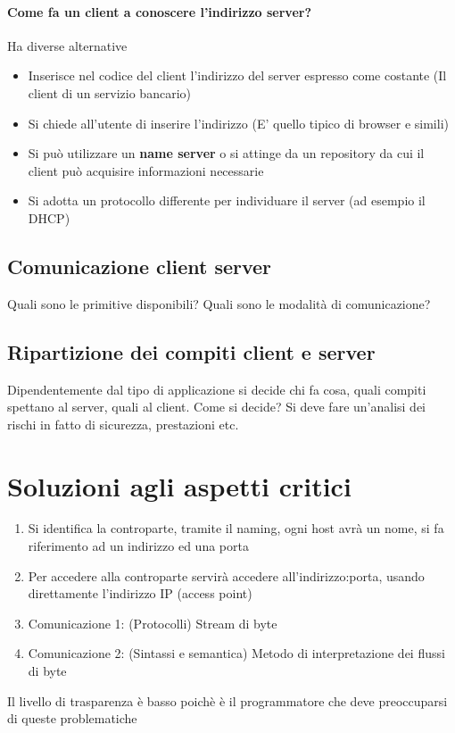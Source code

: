 \documentclass[12pt, a4paper, openany, twoside]{book}
\begin{document}
\paragraph{Come fa un client a conoscere l'indirizzo server?} Ha diverse alternative
\begin{itemize}
	\item Inserisce nel codice del client l'indirizzo del server espresso
	come costante (Il client di un servizio bancario)
	\item Si chiede all'utente di inserire l'indirizzo (E' quello tipico di 
	browser e simili)
	\item Si può utilizzare un \textbf{name server} o si attinge da un repository
	da cui il client può acquisire informazioni necessarie
	\item Si adotta un protocollo differente per individuare il server (ad 
	esempio il DHCP)
\end{itemize}
\subsection{Comunicazione client server}
Quali sono le primitive disponibili? Quali sono le modalità di comunicazione?
\subsection{Ripartizione dei compiti client e server}
Dipendentemente dal tipo di applicazione si decide chi fa cosa, quali compiti
spettano al server, quali al client. Come si decide? Si deve fare un'analisi
dei rischi in fatto di sicurezza, prestazioni etc.
\section{Soluzioni agli aspetti critici}
\begin{enumerate}
	\item Si identifica la controparte, tramite il naming, ogni host avrà un nome,
	si fa riferimento ad un indirizzo ed una porta
	\item Per accedere alla controparte servirà accedere all'indirizzo:porta,
	usando direttamente l'indirizzo IP (access point)
	\item Comunicazione 1: (Protocolli) Stream di byte
	\item Comunicazione 2: (Sintassi e semantica) Metodo di interpretazione dei 
	flussi di byte 
\end{enumerate}
Il livello di trasparenza è basso poichè è il programmatore che deve preoccuparsi
di queste problematiche
\end{document}
